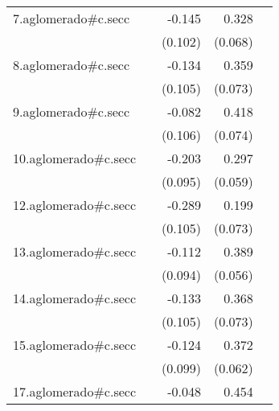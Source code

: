 {\begin{longtable}{l*{4}{D{.}{.}{-1}}}
\addlinespace
7.aglomerado#c.secc&                     &      -0.145         &       0.328\sym{***}&                     \\
            &                     &     (0.102)         &     (0.068)         &                     \\
\addlinespace
8.aglomerado#c.secc&                     &      -0.134         &       0.359\sym{***}&                     \\
            &                     &     (0.105)         &     (0.073)         &                     \\
\addlinespace
9.aglomerado#c.secc&                     &      -0.082         &       0.418\sym{***}&                     \\
            &                     &     (0.106)         &     (0.074)         &                     \\
\addlinespace
10.aglomerado#c.secc&                     &      -0.203\sym{*}  &       0.297\sym{***}&                     \\
            &                     &     (0.095)         &     (0.059)         &                     \\
\addlinespace
12.aglomerado#c.secc&                     &      -0.289\sym{**} &       0.199\sym{**} &                     \\
            &                     &     (0.105)         &     (0.073)         &                     \\
\addlinespace
13.aglomerado#c.secc&                     &      -0.112         &       0.389\sym{***}&                     \\
            &                     &     (0.094)         &     (0.056)         &                     \\
\addlinespace
14.aglomerado#c.secc&                     &      -0.133         &       0.368\sym{***}&                     \\
            &                     &     (0.105)         &     (0.073)         &                     \\
\addlinespace
15.aglomerado#c.secc&                     &      -0.124         &       0.372\sym{***}&                     \\
            &                     &     (0.099)         &     (0.062)         &                     \\
\addlinespace
17.aglomerado#c.secc&                     &      -0.048         &       0.454\sym{***}&                     \\

\end{longtable}}
